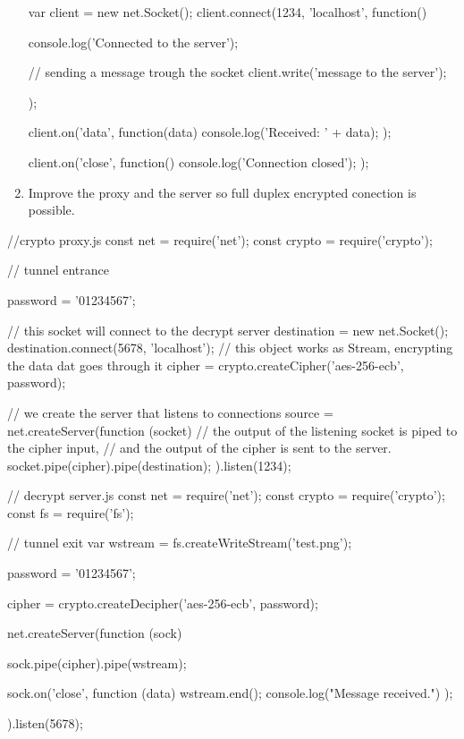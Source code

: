 \begin{Exercise}[label={proxy}]
\begin{enumerate}
\begin{js}
    var client = new net.Socket();
    client.connect(1234, 'localhost', function() {
      console.log('Connected to the server');
      
      // sending a message trough the socket
      client.write('message to the server');
    });
    
    client.on('data', function(data) {
      console.log('Received: ' + data);
    });
    
    client.on('close', function() {
      console.log('Connection closed');
    });
  \end{js}
	
	\item Improve the proxy and the server so full duplex encrypted conection is possible.
\end{enumerate}
\end{Exercise}
\begin{Answer}[ref={proxy}]
\begin{js}
//crypto proxy.js
const net = require('net');
const crypto = require('crypto');

// tunnel entrance

password = '01234567';

// this socket will connect to the decrypt server
destination = new net.Socket();
destination.connect(5678, 'localhost');
// this object works as Stream, encrypting the data dat goes through it
cipher = crypto.createCipher('aes-256-ecb', password);

// we create the server that listens to connections
source = net.createServer(function (socket) {
    // the output of the listening socket is piped to the cipher input,
    // and the output of the cipher is sent to the server.
    socket.pipe(cipher).pipe(destination);
}).listen(1234);
\end{js}


\begin{js}
// decrypt server.js
const net = require('net');
const crypto = require('crypto');
const fs = require('fs');

// tunnel exit
var wstream = fs.createWriteStream('test.png');

password = '01234567';

cipher = crypto.createDecipher('aes-256-ecb', password);

net.createServer(function (sock) {
    sock.pipe(cipher).pipe(wstream);

    sock.on('close', function (data) {
        wstream.end();
        console.log("Message received.")
    });
}).listen(5678);
\end{js}
\end{Answer}